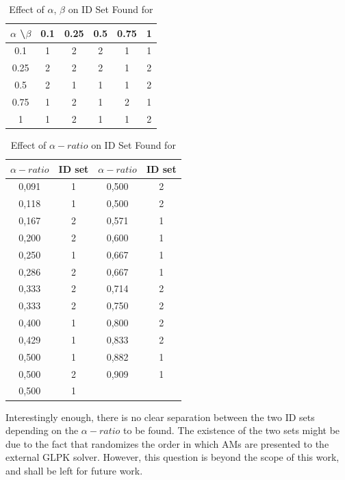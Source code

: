\begin{table}
  \caption{Effect of $\alpha$, $\beta$ on ID Set Found for }
  \bigskip
  \label{table-experiments-various-betas-ova1-effect}
  \centering
  \begin{tabular}{c | c  c  c  c  c}
    $\alpha$ \textbackslash $\beta$ & 0.1 & 0.25 & 0.5 & 0.75 & 1 \\
    \hline
    0.1  & 1 & 2 & 2 & 1 & 1 \\
    0.25 & 2 & 2 & 2 & 1 & 2 \\
    0.5  & 2 & 1 & 1 & 1 & 2 \\
    0.75 & 1 & 2 & 1 & 2 & 1 \\
    1    & 1 & 2 & 1 & 1 & 2 \\
  \end{tabular}
\end{table}

\begin{table}
  \caption{Effect of $\alpha-ratio$ on ID Set Found for }
  \bigskip
  \label{table-experiments-various-betas-ova1-ratio-effect}
  \centering
  \begin{tabular}{c | c || c |  c}
    $\alpha-ratio$ & ID set & $\alpha-ratio$ & ID set \\
    \hline
    0,091	& 1 & 0,500	& 2 \\
    0,118	& 1 & 0,500	& 2 \\
    0,167	& 2 & 0,571	& 1 \\
    0,200	& 2 & 0,600	& 1 \\
    0,250	& 1 & 0,667	& 1 \\
    0,286	& 2 & 0,667	& 1 \\
    0,333	& 2 & 0,714	& 2 \\
    0,333	& 2 & 0,750	& 2 \\
    0,400	& 1 & 0,800	& 2 \\
    0,429	& 1 & 0,833	& 2 \\
    0,500	& 1 & 0,882	& 1 \\
    0,500	& 2 & 0,909	& 1 \\
    0,500	& 1 &       &   \\
  \end{tabular}
\end{table}

Interestingly enough, there is no clear separation between the two ID sets depending on the $\alpha-ratio$ to be found. The existence of the two sets might be due to the fact that  randomizes the order in which AMs are presented to the external GLPK solver. However, this question is beyond the scope of this work, and shall be left for future work.


